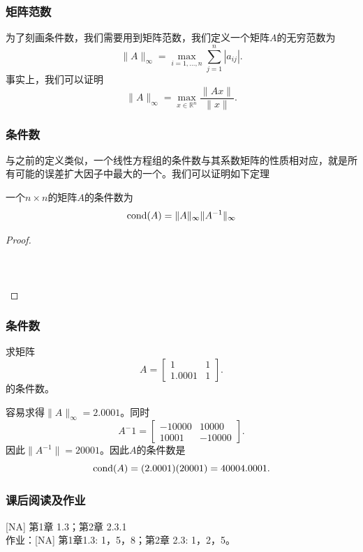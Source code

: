 \documentclass[10pt]{beamer}
\def\R{\mathbb{R}}
\begin{document}
\begin{frame}
\frametitle{矩阵范数}
为了刻画条件数，我们需要用到矩阵范数，我们定义一个矩阵$A$的无穷范数为
\begin{equation}
\|A\|_{\infty} = \max_{i = 1, \ldots, n} \sum_{j = 1}^{n} |a_{ij}|.
\end{equation}
事实上，我们可以证明
\begin{equation}
\|A\|_{\infty} = \max_{x \in \R^n} \frac{\|Ax\|}{\|x\|}.
\end{equation}
\end{frame}


\begin{frame}
\frametitle{条件数}
与之前的定义类似，一个线性方程组的条件数与其系数矩阵的性质相对应，就是所有可能的误差扩大因子中最大的一个。我们可以证明如下定理
\begin{theorem}
一个$n \times n$的矩阵$A$的条件数为
\begin{equation}
\text{{\rm{cond}}}(A) = \|A\|_\infty \|A^{-1}\|_\infty
\end{equation}
\end{theorem}
\begin{proof}
\ \\
\ \\
\ \\
\ \\
\end{proof}
\end{frame}


\begin{frame}
\frametitle{条件数}
\begin{example}
求矩阵
\begin{equation}
A =  \left[ \begin{array}{cc}
     1    &  1 \\
      1.0001   &  1                
            \end{array} \right] .
\end{equation}
的条件数。
\end{example}
容易求得$\|A \|_\infty = 2.0001$。同时
\begin{equation}
A^-1 =  \left[ \begin{array}{cc}
     -10000    &  10000 \\
      10001   &  -10000                
            \end{array} \right] .
\end{equation}
因此$\|A^{-1}\| = 20001$。因此$A$的条件数是
\begin{equation}
\text{{\rm{cond}}}(A) = (2.0001)(20001) = 40004.0001.
\end{equation}
\end{frame}

\begin{frame}
\frametitle{课后阅读及作业}
[NA] 第1章 1.3；第2章 2.3.1\\
作业：[NA] 第1章1.3: 1，5，8；第2章 2.3: 1，2，5。


\end{frame}
\end{document}
